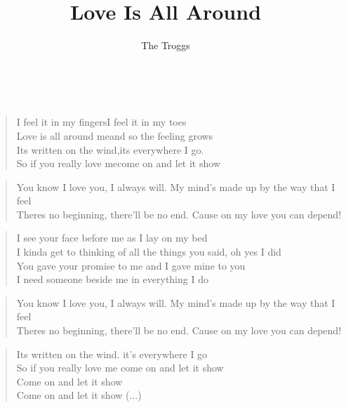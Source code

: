 \documentclass[9pt,a4paper,oneside, onecolumn]{article}
\author{The Troggs}
\title{Love Is All Around}
\date{}
\begin{document}
\raggedcolumns
\maketitle
\thispagestyle{empty}

\mbox{
}\\

\begin{verse}
I feel it in my fingers\quad I feel it in my toes\qquad{}\qquad{}\\
Love is all around me\quad and so the feeling grows\qquad{}\qquad{}\\
Its written on the wind,\quad its everywhere I go.\qquad{}\qquad{}\\
So if you really love me\quad come on and let it show\qquad{}\qquad{}\\
\end{verse}

\begin{verse}
\quad You know I love you, I always will. My mind's made up by the way that I feel\\
\quad Theres no beginning, there'll be no end. Cause on my love you can depend!\\
\end{verse}

\begin{verse}
I see your face before me as I lay on my bed\\
I kinda get to thinking of all the things you said, oh yes I did\\
You gave your promise to me and I gave mine to you\\
I need someone beside me in everything I do\\
\end{verse}

\begin{verse}
You know I love you, I always will. My mind's made up by the way that I feel\\
Theres no beginning, there'll be no end. Cause on my love you can depend!
\end{verse}

\begin{verse}
Its written on the wind. it's everywhere I go\\
So if you really love me come on and let it show\\

Come on and let it show\\
Come on and let it show (...)\\
\end{verse}
\end{document}
